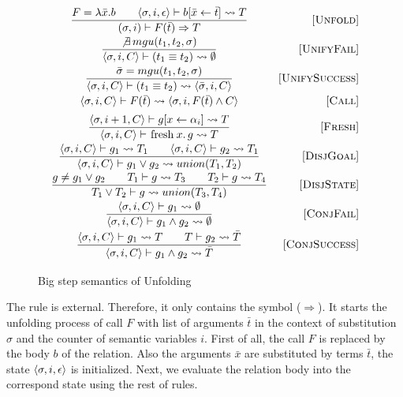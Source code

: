 \begin{figure}[h!]
\[\begin{array}{cr}

\dfrac{ F = \lambda \bar{x}. b \qquad \inbr{\sigma, i, \epsilon} \vdash b[\bar{x} \leftarrow \bar{t}] \leadsto T}
      {(\sigma, i) \vdash F(\bar{t}) \Rightarrow T}
&     \ruleno{Unfold} \\[3mm]
\dfrac{\not\exists \, mgu(t_1, t_2, \sigma)}
      {\inbr{\sigma, i, C} \vdash (t_1 \equiv t_2) \leadsto \emptyset}
&     \ruleno{UnifyFail}  \\[3mm]
\dfrac{\bar\sigma = mgu(t_1, t_2, \sigma)}
      {\inbr{\sigma, i, C} \vdash (t_1 \equiv t_2) \leadsto \inbr{\bar\sigma, i, C}}
&     \ruleno{UnifySuccess}  \\[3mm]
      {\inbr{\sigma, i, C} \vdash F(\bar{t}) \leadsto \inbr{ \sigma, i, F(\bar{t}) \land C}}
&     \ruleno{Call} \\[2mm]
\dfrac{\inbr{\sigma, i+1, C} \vdash g[x \leftarrow \alpha_i] \leadsto T}
      {\inbr{\sigma, i, C} \vdash \mbox{\lstinline|fresh|} \, x. \, g \leadsto T}
&     \ruleno{Fresh}  \\[3mm]
\dfrac{\inbr{\sigma, i, C} \vdash g_1 \leadsto T_1 \qquad \inbr{\sigma, i, C} \vdash g_2 \leadsto T_1}
      {\inbr{\sigma, i, C} \vdash g_1 \lor g_2 \leadsto union(T_1, T_2)}
&     \ruleno{DisjGoal}  \\[3mm]
\dfrac{g \not= g_1 \lor g_2 \qquad T_1 \vdash g \leadsto T_3 \qquad T_2 \vdash g \leadsto T_4}
      {T_1 \lor T_2 \vdash g \leadsto union(T_3, T_4)}
&     \ruleno{DisjState}  \\[3mm]
\dfrac{\inbr{\sigma, i, C} \vdash g_1 \leadsto \emptyset}
      {\inbr{\sigma, i, C} \vdash g_1 \land g_2 \leadsto \emptyset}
&     \ruleno{ConjFail}  \\[3mm]
\dfrac{\inbr{\sigma, i, C} \vdash g_1 \leadsto T \qquad T \vdash g_2 \leadsto \bar{T}}
      {\inbr{\sigma, i, C} \vdash g_1 \land g_2 \leadsto \bar{T}}
&     \ruleno{ConjSuccess}  \\[3mm]
\end{array}\]

\caption{Big step semantics of Unfolding}
\label{fair:unfolding-semantics}
\end{figure}

The  rule is external. 
Therefore, it only contains the symbol ($\Rightarrow$). 
It starts the unfolding process of call $F$ with list of arguments $\bar{t}$ in the context of substitution $\sigma$ and the counter of semantic variables $i$.
First of all, the call $F$ is replaced by the body $b$ of the relation. Also the arguments $\bar{x}$ are substituted by terms $\bar{t}$, the state $\langle \sigma, i, \epsilon \rangle$ is initialized. Next, we evaluate the relation body into the correspond state using the rest of rules.


